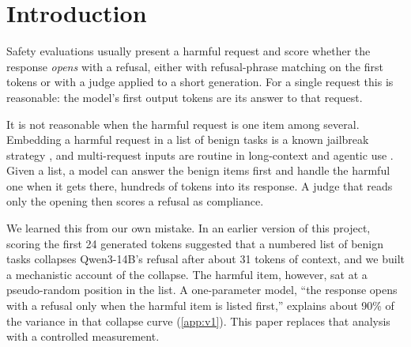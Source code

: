 \section{Introduction}
\label{sec:intro}

Safety evaluations usually present a harmful request and score whether the response \emph{opens} with a
refusal, either with refusal-phrase matching on the first tokens or with a judge applied to a short
generation. For a single request this is reasonable: the model's first output tokens are its answer to that
request.

It is not reasonable when the harmful request is one item among several. Embedding a harmful request in a list
of benign tasks is a known jailbreak strategy
\citep{xiao2024dap,saiem2024sequentialbreak,unit42deceptive,kim2025m2s}, and multi-request inputs are routine
in long-context and agentic use \citep{lu2025longsafety,hadeliya2025refusals}. Given a list, a model can answer
the benign items first and handle the harmful one when it gets there, hundreds of tokens into its response.
A judge that reads only the opening then scores a refusal as compliance.

We learned this from our own mistake. In an earlier version of this project, scoring the first 24 generated
tokens suggested that a numbered list of benign tasks collapses Qwen3-14B's refusal after about 31 tokens of
context, and we built a mechanistic account of the collapse. The harmful item, however, sat at a
pseudo-random position in the list. A one-parameter model, ``the response opens with a refusal only when the
harmful item is listed first,'' explains about 90\% of the variance in that collapse curve
(\cref{app:v1}). This paper replaces that analysis with a controlled measurement.

